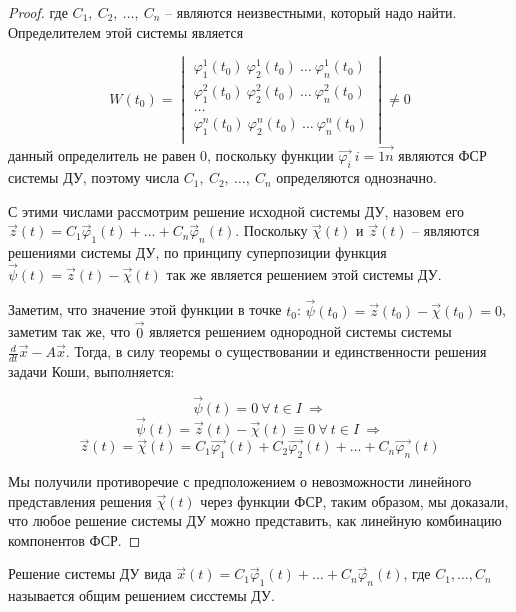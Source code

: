 \begin{proof}
    где $C_1, ~ C_2, ~ \dots, ~ C_n$ -- являются неизвестными, который надо найти. Определителем этой системы является
    
    \begin{equation}
        W(t_0) = 
        \begin{vmatrix}
        \varphi_1^1(t_0) ~ \varphi_2^1(t_0) ~ \dots ~ \varphi_n^1(t_0) \\
        \varphi_1^2(t_0) ~ \varphi_2^2(t_0) ~ \dots ~ \varphi_n^2(t_0) \\
        \dots \\
        \varphi_1^n(t_0) ~ \varphi_2^n(t_0) ~ \dots ~ \varphi_n^n(t_0) \\
        \end{vmatrix} \neq 0
    \end{equation}
    данный определитель не равен 0, поскольку функции $\vec{\varphi_i} ~ i = \vec{1n}$ являются ФСР системы ДУ, поэтому числа $C_1, ~ C_2, ~ \dots, ~ C_n$ определяются однозначно.
    
    С этими числами рассмотрим решение исходной системы ДУ, назовем его $\vec{z}(t) = C_1 \vec \varphi_1(t) + \dots + C_n \vec \varphi_n(t)$. Поскольку $\vec{\chi}(t)$ и $\vec{z}(t)$ -- являются решениями системы ДУ, по принципу суперпозиции функция $\vec{\psi}(t) = \vec{z}(t) - \vec{\chi}(t)$ так же является решением этой системы ДУ. 
    
    Заметим, что значение этой функции в точке $t_0$: $\vec{\psi}(t_0) = \vec{z}(t_0) - \vec{\chi}(t_0) = 0$, заметим так же, что $\vec{0}$ является решением однородной системы системы $\frac{d}{dt} \vec{x} - A \vec{x}$. Тогда, в силу теоремы о существовании и единственности решения задачи Коши, выполняется:
    
    \[ \vec{\psi}(t) = 0 ~ \forall ~ t \in I ~ \Rightarrow \]
    \[ \vec{\psi}(t) = \vec{z}(t) - \vec{\chi}(t) \equiv 0 ~ \forall ~ t \in I ~ \Rightarrow \]
    \[ \vec{z}(t) = \vec{\chi}(t) = C_1 \vec{\varphi_1}(t) + C_2 \vec{\varphi_2}(t) + \dots + C_n \vec{\varphi_n}(t) \]
    
    Мы получили противоречие с предположением о невозможности линейного представления решения $\vec{\chi}(t)$ через функции ФСР, таким образом, мы доказали, что любое решение системы ДУ можно представить, как линейную комбинацию компонентов ФСР.
\end{proof}

\begin{definition}
    Решение системы ДУ вида $\vec x(t) = C_1 \vec \varphi_1(t) + \dots + C_n \vec \varphi_n(t)$, где $C_1, \dots, C_n$
    называется общим решением сисстемы ДУ.
\end{definition}

